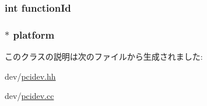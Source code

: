 \label{classPciDevice_1_1PciConfigPort_ae33571d7242e04fb46496c9852fad407}
\hypertarget{classPciDevice_1_1PciConfigPort_a2f4fdcfa0ddbad69ad60222dd5676868}{
\subsubsection[{functionId}]{\setlength{\rightskip}{0pt plus 5cm}int {\bf functionId}}}
\label{classPciDevice_1_1PciConfigPort_a2f4fdcfa0ddbad69ad60222dd5676868}
\hypertarget{classPciDevice_1_1PciConfigPort_a75b48f1787959a4617f2a599d7c09aab}{
\subsubsection[{platform}]{$\ast$ {\bf platform}}}
\label{classPciDevice_1_1PciConfigPort_a75b48f1787959a4617f2a599d7c09aab}


このクラスの説明は次のファイルから生成されました:\begin{DoxyCompactItemize}
\item 
dev/\hyperlink{pcidev_8hh}{pcidev.hh}\item 
dev/\hyperlink{pcidev_8cc}{pcidev.cc}\end{DoxyCompactItemize}
